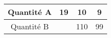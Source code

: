\begin{tabular}{|c|c|c|c|}
\hline
Quantité A & 19 & 10 & 9 \\ \hline
Quantité B & \kern1cm & 110 & 99 \\ \hline
\end{tabular}

